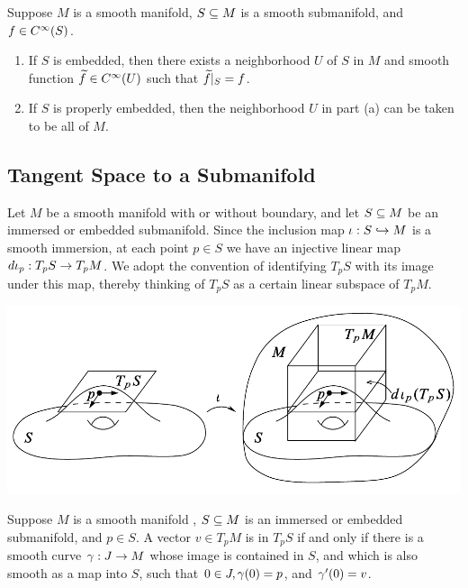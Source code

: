 \setcounter{thm}{33}

\begin{lem}
Suppose $M$ is a smooth manifold, $S\subseteq M$ is a smooth submanifold, and $f\in C^\infty(S)$.
\begin{enumerate}
    \item If $S$ is embedded, then there exists a neighborhood $U$ of $S$ in $M$ and smooth function $\widetilde f\in C^\infty(U)$ such that $\widetilde f|_S = f$.
    \item If $S$ is properly embedded, then the neighborhood $U$ in part (a) can be taken to be all of $M$.
\end{enumerate}
\end{lem}

\newpage
\subsection{Tangent Space to a Submanifold}\nl

\dfn Let $M$ be a smooth manifold with or without boundary, and let $S\subseteq M$ be an immersed or embedded submanifold. Since the inclusion map $\iota:S\hookrightarrow M$ is a smooth immersion, at each point $p\in S$ we have an injective linear map $d\iota_p:T_pS \rightarrow T_pM$. We adopt the convention of identifying $T_pS$ with its image under this map, thereby thinking of $T_pS$ as a certain linear subspace of $T_pM$.

\begin{center}
    \includegraphics[scale = 0.45]{chapter05/c5f12.png}
\end{center}

\begin{prop}
Suppose $M$ is a smooth manifold \wowob, $S\subseteq M$ is an immersed or embedded submanifold, and $p\in S$. A vector $v\in T_pM$ is in $T_pS$ if and only if there is a smooth curve $\gamma:J\rightarrow M$ whose image is contained in $S$, and which is also smooth as a map into $S$, such that $0\in J,\gamma(0) = p$, and $\gamma^\prime(0) = v$.
\end{prop}


